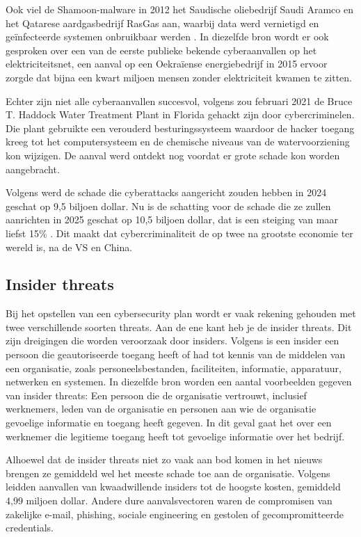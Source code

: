 Ook viel de Shamoon-malware in 2012 het Saudische oliebedrijf Saudi Aramco en het Qatarese aardgasbedrijf RasGas aan, waarbij data werd vernietigd en geïnfecteerde systemen onbruikbaar werden \autocite{Hemsley2018}.
In diezelfde bron wordt er ook gesproken over een van de eerste publieke bekende cyberaanvallen op het elektriciteitsnet, een aanval op een Oekraïense energiebedrijf in 2015 ervoor zorgde dat bijna een kwart miljoen mensen zonder elektriciteit kwamen te zitten.

Echter zijn niet alle cyberaanvallen succesvol, volgens \textcite{Margolin2021} zou februari 2021 de Bruce T. Haddock Water Treatment Plant in Florida gehackt zijn door cybercriminelen. Die plant gebruikte een verouderd besturingssysteem waardoor de hacker toegang kreeg tot het computersysteem en de chemische niveaus van de watervoorziening kon wijzigen. De aanval werd ontdekt nog voordat er grote schade kon worden aangebracht.



Volgens \textcite{Morgan2024} werd de schade die cyberattacks aangericht zouden hebben in 2024 geschat op 9,5 biljoen dollar. Nu is de schatting voor de schade die ze zullen aanrichten in 2025 geschat op 10,5 biljoen dollar, dat is een steiging van maar liefst 15\% . Dit maakt dat cybercriminaliteit de op twee na grootste economie ter wereld is, na de VS en China.

\subsection{Insider threats}
Bij het opstellen van een cybersecurity plan wordt er vaak rekening gehouden met twee verschillende soorten threats. Aan de ene kant heb je de insider threats. Dit zijn dreigingen die worden veroorzaak door insiders. Volgens \textcite{Cisa2025} is een insider een persoon die geautoriseerde toegang heeft of had tot kennis van de middelen van een organisatie, zoals personeelsbestanden, faciliteiten, informatie, apparatuur, netwerken en systemen. In diezelfde bron worden een aantal voorbeelden gegeven van insider threats: Een persoon die de organisatie vertrouwt, inclusief werknemers, leden van de organisatie en personen aan wie de organisatie gevoelige informatie en toegang heeft gegeven. In dit geval gaat het over een werknemer die legitieme toegang heeft tot gevoelige informatie over het bedrijf.

Alhoewel dat de insider threats niet zo vaak aan bod komen in het nieuws brengen ze gemiddeld wel het meeste schade toe aan de organisatie. Volgens \textcite{ibm2024} leidden aanvallen van kwaadwillende insiders tot de hoogste kosten, gemiddeld 4,99 miljoen dollar. Andere dure aanvalsvectoren waren de compromisen van zakelijke e-mail, phishing, sociale engineering en gestolen of gecompromitteerde credentials. 

